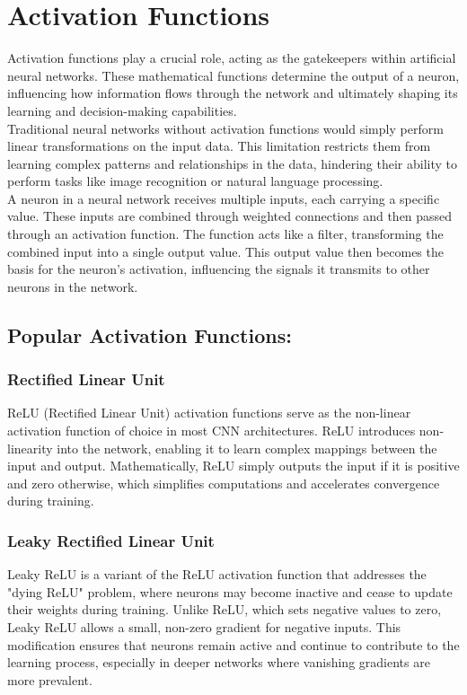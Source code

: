 \documentclass{article}
\begin{document}
\section{Activation Functions}
Activation functions play a crucial role, acting as the gatekeepers within artificial neural networks. These mathematical functions determine the output of a neuron, influencing how information flows through the network and ultimately shaping its learning and decision-making capabilities.\\
Traditional neural networks without activation functions would simply perform linear transformations on the input data. This limitation restricts them from learning complex patterns and relationships in the data, hindering their ability to perform tasks like image recognition or natural language processing.\\
A neuron in a neural network receives multiple inputs, each carrying a specific value. These inputs are combined through weighted connections and then passed through an activation function. The function acts like a filter, transforming the combined input into a single output value. This output value then becomes the basis for the neuron's activation, influencing the signals it transmits to other neurons in the network.

\subsection{Popular Activation Functions:}
\subsubsection{Rectified Linear Unit}
ReLU (Rectified Linear Unit) activation functions serve as the non-linear activation function of choice in most CNN architectures. ReLU introduces non-linearity into the network, enabling it to learn complex mappings between the input and output. Mathematically, ReLU simply outputs the input if it is positive and zero otherwise, which simplifies computations and accelerates convergence during training.

\subsubsection{Leaky Rectified Linear Unit}
Leaky ReLU is a variant of the ReLU activation function that addresses the "dying ReLU" problem, where neurons may become inactive and cease to update their weights during training. Unlike ReLU, which sets negative values to zero, Leaky ReLU allows a small, non-zero gradient for negative inputs. This modification ensures that neurons remain active and continue to contribute to the learning process, especially in deeper networks where vanishing gradients are more prevalent.
\end{document}
